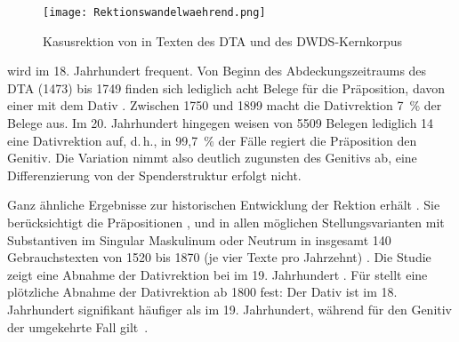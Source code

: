 \begin{figure}
\centering
\texttt{[image: Rektionswandelwaehrend.png]}
\caption{Kasusrektion von \waehrend{} in Texten des DTA und des DWDS-Kernkorpus \citep[s.][]{Vieregge.2019}}
\label{pic:Rektionswandelwaehrend}
\end{figure}

 wird im 18. Jahrhundert frequent. Von Beginn des Abdeckungszeitraums des DTA (1473) bis 1749 finden sich lediglich acht Belege für die Präposition, davon einer mit dem Dativ \citep[s.][]{Vieregge.2019}.
Zwischen 1750 und 1899 macht die Dativrektion 7~\% der Belege aus. 
Im 20. Jahrhundert hingegen weisen von 5509 Belegen lediglich 14 eine Dativrektion auf, d.\,h., in 99,7~\% der Fälle regiert die Präposition den Genitiv. 
Die Variation nimmt also deutlich zugunsten des Genitivs ab, eine Differenzierung von der Spenderstruktur erfolgt nicht. 

Ganz ähnliche Ergebnisse zur historischen Entwicklung der Rektion erhält \citet[]{Sato.2015}. 
Sie berücksichtigt die Präpositionen \wegen, \waehrend{} und  in allen möglichen Stellungsvarianten mit Substantiven im Singular Maskulinum oder Neutrum in insgesamt 140 Gebrauchstexten von 1520 bis 1870 (je vier Texte pro Jahrzehnt) \citep[s.][30]{Sato.2015}. 
Die Studie zeigt eine Abnahme der Dativrektion bei  im 19. Jahrhundert \citep[s.][45--46]{Sato.2015}.
Für \wegen{}  stellt \citet[33]{Sato.2015} eine pl{\"o}tzliche Abnahme der Dativrektion ab 1800 fest: 
Der Dativ ist im 18. Jahrhundert signifikant h{\"a}ufiger als im 19. Jahrhundert, w{\"a}hrend f{\"u}r den Genitiv der umgekehrte Fall gilt~\citep[s.][34]{Sato.2015}.

